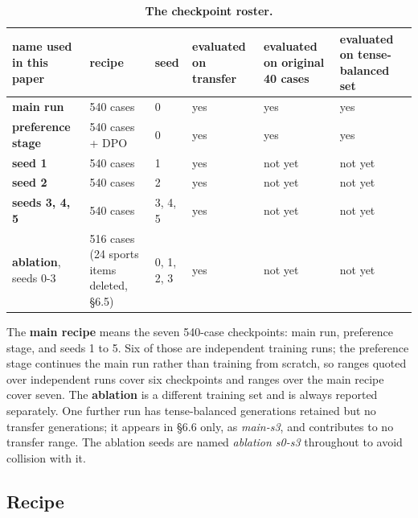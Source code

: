 \documentclass[10pt]{article}
\newcommand{\tablefont}{\fontsize{8.7pt}{11.5pt}\selectfont}
\begin{document}
\begin{table}[!htbp]
\centering
\tablefont
\caption{\textbf{The checkpoint roster.}}
\begin{tabular}{|F{2.2cm}|M{2.9cm}|M{0.9cm}|M{1.7cm}|M{2.5cm}|M{2.5cm}|}
\hline
{}\textbf{name used in this paper} & \textbf{recipe} & \textbf{seed} & \textbf{evaluated on transfer} & \textbf{evaluated on original 40 cases} & \textbf{evaluated on tense-balanced set} \\
\hline
\textbf{main run} & 540 cases & 0 & yes & yes & yes \\
\hline
\textbf{preference stage} & 540 cases + DPO & 0 & yes & yes & yes \\
\hline
\textbf{seed 1} & 540 cases & 1 & yes & not yet & not yet \\
\hline
\textbf{seed 2} & 540 cases & 2 & yes & not yet & not yet \\
\hline
\textbf{seeds 3, 4, 5} & 540 cases & 3, 4, 5 & yes & not yet & not yet \\
\hline
\textbf{ablation}, seeds 0-3 & 516 cases (24 sports items deleted, \S6.5) & 0, 1, 2, 3 & yes & not yet & not yet \\
\hline
\end{tabular}
\end{table}

The \textbf{main recipe} means the seven 540-case checkpoints: main run, preference stage, and seeds 1 to 5.
Six of those are independent training runs; the preference stage continues the main run rather than training from scratch, so ranges quoted over independent runs cover six checkpoints and ranges over the main recipe cover seven. The \textbf{ablation} is a different training set and is always reported
separately. One further run has tense-balanced generations retained but no transfer generations; it appears in
\S6.6 only, as \textit{main-s3}, and contributes to no transfer range. The ablation seeds are named \textit{ablation s0-s3} throughout to avoid collision with it.

\subsection{Recipe}
\end{document}
